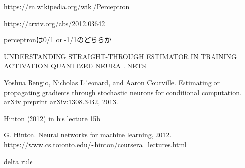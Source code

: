 \url{https://en.wikipedia.org/wiki/Perceptron}

\url{https://arxiv.org/abs/2012.03642}


perceptronは0/1 or -1/1のどちらか

UNDERSTANDING STRAIGHT-THROUGH ESTIMATOR IN TRAINING ACTIVATION QUANTIZED NEURAL NETS

Yoshua Bengio, Nicholas L´eonard, and Aaron Courville. Estimating or propagating gradients through stochastic neurons for conditional computation. arXiv preprint arXiv:1308.3432, 2013.

Hinton (2012) in his lecture 15b

G. Hinton. Neural networks for machine learning, 2012.
\url{https://www.cs.toronto.edu/~hinton/coursera_lectures.html}

delta rule
